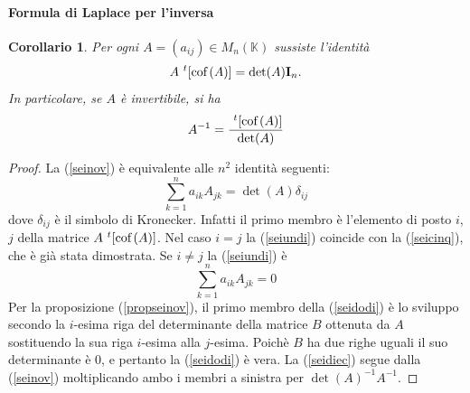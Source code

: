 \documentclass{article}
\theoremstyle{plain}
\newtheorem{cor}{Corollario}
\theoremstyle{definition}
\theoremstyle{remark}
\begin{document}
\paragraph{Formula di Laplace per l'inversa}
\begin{bxthm}
\begin{cor}
    Per ogni $A=(a_{ij})\in M_n(\mathbb{K})$ sussiste l'identità 
    \begin{equation}
        A\ ^{t}[\textup{cof}\,(A)]=\det(A)\mathbf{I}_n.\label{seinov}
    \end{equation}
    In particolare, se $A$ è invertibile, si ha 
    \begin{equation}
        A^{-1}=\dfrac{\ ^{t}[\textup{cof}\,(A)]}{\det(A)}\label{seidiec}
    \end{equation}
\end{cor}
\end{bxthm}
\begin{proof}
    La (\ref{seinov}) è equivalente alle $n^2$ identità seguenti:
    \begin{equation}
        \sum_{k=1}^{n}a_{ik}A_{jk}=\det(A)\delta_{ij}\label{seiundi}
    \end{equation}
    dove $\delta_{ij}$ è il simbolo di Kronecker. Infatti il primo membro è l'elemento di posto $i$, $j$ della matrice $A\ ^{t}[\textup{cof}\,(A)]$. 
    Nel caso $i=j$ la (\ref{seiundi}) coincide con la (\ref{seicinq}), che è già stata dimostrata.
    Se $i\neq j$ la (\ref{seiundi}) è 
    \begin{equation}
        \sum_{k=1}^{n}a_{ik}A_{jk}=0 \label{seidodi}
    \end{equation}
    Per la proposizione (\ref{propseinov}), il primo membro della (\ref{seidodi}) è lo sviluppo secondo la $i$-esima riga del 
    determinante della matrice $B$ ottenuta da $A$ sostituendo la sua riga $i$-esima alla $j$-esima. Poichè $B$ ha due righe uguali il suo determinante è $0$, e pertanto la (\ref{seidodi}) è vera.
    La (\ref{seidiec}) segue dalla (\ref{seinov}) moltiplicando ambo i membri a sinistra per $\det(A)^{-1}A^{-1}$.
\end{proof}

\vspace{10pt}
\end{document}
